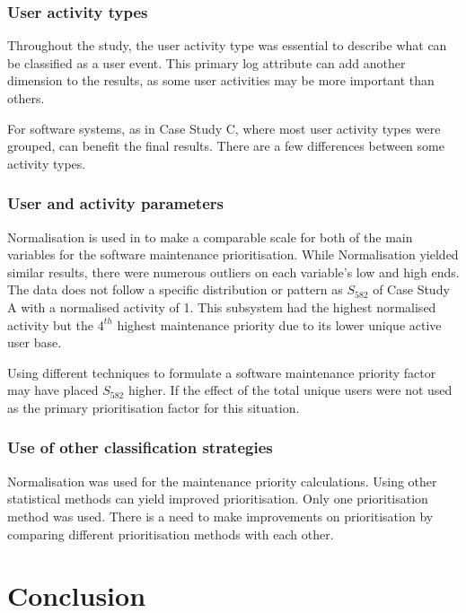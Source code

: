 \subsubsection{User activity types}
Throughout the study, the user activity type was essential to describe what can be classified as a user event. This primary log attribute can add another dimension to the results, as some user activities may be more important than others. \par For software systems, as in Case Study C, where most user activity types were grouped, can benefit the final results. There are a few differences between some activity types. 

\subsubsection{User and activity parameters}
\par Normalisation is used in  to make a comparable scale for both of the main variables for the software maintenance prioritisation. While Normalisation yielded similar results, there were numerous outliers on each variable's low and high ends. The data does not follow a specific distribution or pattern as $S_{582}$ of Case Study A with a normalised activity of 1. This subsystem had the highest normalised activity but the $4^{th}$ highest maintenance priority due to its lower unique active user base.\par Using different techniques to formulate a software maintenance priority factor may have placed $S_{582}$ higher. If the effect of the total unique users were not used as the primary prioritisation factor for this situation. 

\subsubsection{Use of other classification strategies}
Normalisation was used for the maintenance priority calculations. Using other statistical methods can yield improved prioritisation. Only one prioritisation method was used. There is a need to make improvements on prioritisation by comparing different prioritisation methods with each other.

\clearpage

\section{Conclusion}

